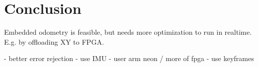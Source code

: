 \chapter{Conclusion}
\label{sec:conclusion}

Embedded odometry is feasible, but needs more optimization to run in realtime. E.g. by offloading XY to FPGA.

- better error rejection
- use IMU
- user arm neon / more of fpga
- use keyframes
